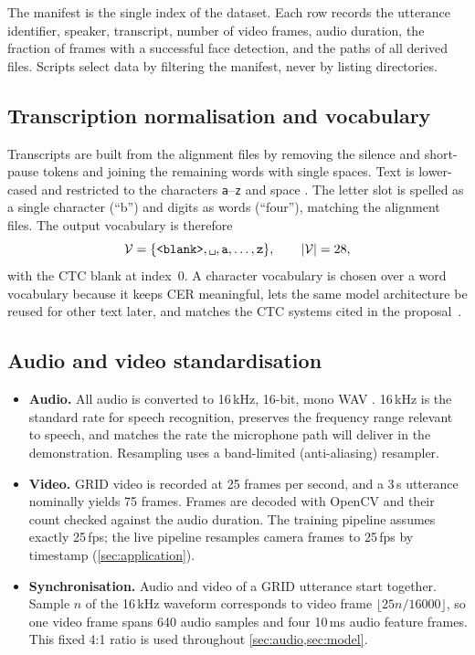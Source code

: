 The manifest is the single index of the dataset. Each row records the
utterance identifier, speaker, transcript, number of video frames, audio
duration, the fraction of frames with a successful face detection, and the
paths of all derived files. Scripts select data by filtering the manifest,
never by listing directories.

\subsection{Transcription normalisation and vocabulary}
Transcripts are built from the alignment files by removing the silence and
short-pause tokens and joining the remaining words with single spaces. Text is
lower-cased and restricted to the characters \texttt{a}--\texttt{z} and space
\rec. The letter slot is spelled as a single character (``b'') and digits as
words (``four''), matching the alignment files. The output vocabulary is
therefore
\begin{equation}
\mathcal{V} = \{\texttt{<blank>}, \texttt{\textvisiblespace}, \texttt{a}, \dots, \texttt{z}\},
\qquad |\mathcal{V}| = 28,
\label{eq:vocab}
\end{equation}
with the CTC blank at index~0. A character vocabulary is chosen over a word
vocabulary because it keeps CER meaningful, lets the same model architecture
be reused for other text later, and matches the CTC systems cited in the
proposal~\cite{kanavnet2026,afouras2022}.

\subsection{Audio and video standardisation}
\begin{itemize}
  \item \textbf{Audio.} All audio is converted to 16\,kHz, 16-bit, mono WAV
        \rec. 16\,kHz is the standard rate for speech recognition, preserves the
        frequency range relevant to speech, and matches the rate the
        microphone path will deliver in the demonstration. Resampling uses a
        band-limited (anti-aliasing) resampler.
  \item \textbf{Video.} GRID video is recorded at 25 frames per second, and a
        3\,s utterance nominally yields 75 frames. Frames are decoded with
        OpenCV and their count checked against the audio duration. The training
        pipeline assumes exactly 25\,fps; the live pipeline resamples camera
        frames to 25\,fps by timestamp (\cref{sec:application}).
  \item \textbf{Synchronisation.} Audio and video of a GRID utterance start
        together. Sample $n$ of the 16\,kHz waveform corresponds to video frame
        $\lfloor 25n/16000 \rfloor$, so one video frame spans 640 audio samples
        and four 10\,ms audio feature frames. This fixed 4:1 ratio is used
        throughout \cref{sec:audio,sec:model}.
\end{itemize}

